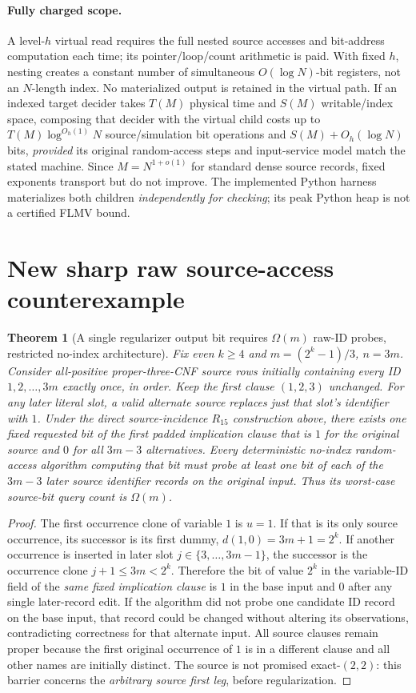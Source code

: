 \documentclass[11pt]{article}
\newtheorem{theorem}{Theorem}
\begin{document}
\paragraph{Fully charged scope.} A level-$h$ virtual read requires the full nested source accesses and bit-address computation each time; its pointer/loop/count arithmetic is paid. With fixed $h$, nesting creates a constant number of simultaneous $O(\log N)$-bit registers, not an $N$-length index. No materialized output is retained in the virtual path. If an indexed target decider takes $T(M)$ physical time and $S(M)$ writable/index space, composing that decider with the virtual child costs up to $T(M)\log^{O_h(1)}N$ source/simulation bit operations and $S(M)+O_h(\log N)$ bits, \emph{provided} its original random-access steps and input-service model match the stated machine. Since $M=N^{1+o(1)}$ for standard dense source records, fixed exponents transport but do not improve. The implemented Python harness materializes both children \emph{independently for checking}; its peak Python heap is not a certified FLMV bound.

\section{New sharp raw source-access counterexample}
\begin{theorem}[A single regularizer output bit requires $\Omega(m)$ raw-ID probes, restricted no-index architecture]
Fix even $k\ge4$ and $m=(2^k-1)/3$, $n=3m$. Consider all-positive proper-three-CNF source rows initially containing every ID $1,2,\ldots,3m$ exactly once, in order. Keep the first clause $(1,2,3)$ unchanged. For any later literal slot, a valid alternate source replaces just that slot's identifier with $1$. Under the direct source-incidence $R_{15}$ construction above, there exists \emph{one fixed requested bit} of the first padded implication clause that is $1$ for the original source and $0$ for all $3m-3$ alternatives. Every deterministic no-index random-access algorithm computing that bit must probe at least one bit of \emph{each} of the $3m-3$ later source identifier records on the original input. Thus its worst-case source-bit query count is $\Omega(m)$.
\end{theorem}
\begin{proof}
The first occurrence clone of variable $1$ is $u=1$. If that is its only source occurrence, its successor is its first dummy, $d(1,0)=3m+1=2^k$. If another occurrence is inserted in later slot $j\in\{3,\ldots,3m-1\}$, the successor is the occurrence clone $j+1\le 3m<2^k$. Therefore the bit of value $2^k$ in the variable-ID field of the \emph{same fixed implication clause} is $1$ in the base input and $0$ after any single later-record edit. If the algorithm did not probe one candidate ID record on the base input, that record could be changed without altering its observations, contradicting correctness for that alternate input. All source clauses remain proper because the first original occurrence of $1$ is in a different clause and all other names are initially distinct. The source is not promised exact-$(2,2)$: this barrier concerns the \emph{arbitrary source first leg}, before regularization.
\end{proof}
\end{document}
